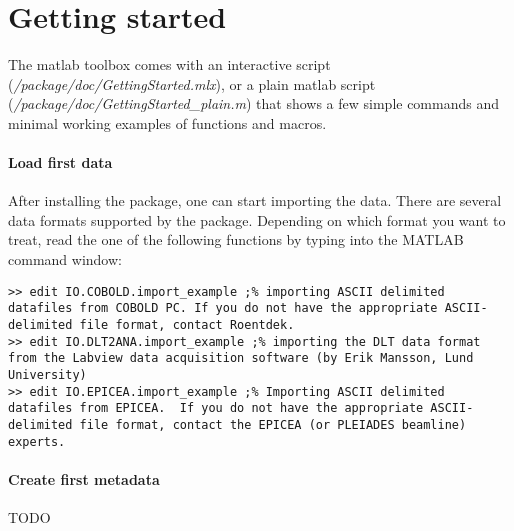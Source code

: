 \section{Getting started}
The matlab toolbox comes with an interactive script (\textit{/package/doc/GettingStarted.mlx}), or a plain matlab script (\textit{/package/doc/GettingStarted\_plain.m}) that shows a few simple commands and minimal working examples of functions and macros. 

\paragraph{Load first data}
After installing the package, one can start importing the data. There are several data formats supported by the package. Depending on which format you want to treat, read the one of the following functions by typing into the MATLAB command window:
\lstset{language=MATLAB}
\begin{lstlisting}
>> edit IO.COBOLD.import_example ;% importing ASCII delimited datafiles from COBOLD PC. If you do not have the appropriate ASCII-delimited file format, contact Roentdek.
>> edit IO.DLT2ANA.import_example ;% importing the DLT data format from the Labview data acquisition software (by Erik Mansson, Lund University)
>> edit IO.EPICEA.import_example ;% Importing ASCII delimited datafiles from EPICEA.  If you do not have the appropriate ASCII-delimited file format, contact the EPICEA (or PLEIADES beamline) experts.
\end{lstlisting}

\paragraph{Create first metadata}
TODO
